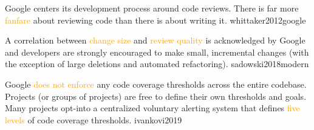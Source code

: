 \documentclass{article}
\renewcommand\ul[1]{\textcolor{orange}{#1}}
\begin{document}






  {Google centers its development process around code reviews. There is far more \ul{fanfare} about reviewing code than there is about writing it.}
  {whittaker2012google}

  {A correlation between \ul{change size} and \ul{review quality} is acknowledged by Google and developers are strongly encouraged to make small, incremental changes (with the exception of large deletions and automated refactoring).}
  {sadowski2018modern}


  {Google \ul{does not enforce} any code coverage thresholds across the entire codebase. Projects (or groups of projects) are free to define their own thresholds and goals. Many projects opt-into a centralized voluntary alerting system that defines \ul{five levels} of code coverage thresholds.}
  {ivankovi2019}


\end{document}
